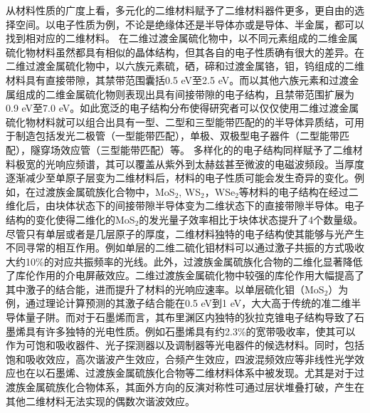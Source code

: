     从材料性质的广度上看，多元化的二维材料赋予了二维材料器件更多，更自由的选择空间。以电子性质为例，不论是绝缘体还是半导体亦或是导体、半金属，都可以找到相对应的二维材料。
    在二维过渡金属硫化物中，以不同元素组成的二维金属硫化物材料虽然都具有相似的晶体结构，但其各自的电子性质确有很大的差异。在二维过渡金属硫化物中，以六族元素硫，硒，碲和过渡金属铬，钼，钨组成的二维材料具有直接带隙，其禁带范围囊括0.5 eV至2.5 eV。而以其他六族元素和过渡金属组成的二维金属硫化物则表现出具有间接带隙的电子结构，且禁带范围扩展为0.9 eV至7.0 eV。如此宽泛的电子结构分布使得研究者可以仅仅使用二维过渡金属硫化物材料就可以组合出具有一型、二型和三型能带匹配的的半导体异质结，可用于制造包括发光二极管（一型能带匹配），单极、双极型电子器件（二型能带匹配），隧穿场效应管（三型能带匹配）等。
    多样化的的电子结构同样赋予了二维材料极宽的光响应频谱，其可以覆盖从紫外到太赫兹甚至微波的电磁波频段。当厚度逐渐减少至单原子层变为二维材料后，材料的电子性质可能会发生奇异的变化。例如，在过渡族金属硫族化合物中，MoS$_2$, WS$_2$，WSe$_2$等材料的电子结构在经过二维化后，由块体状态下的间接带隙半导体变为二维状态下的直接带隙半导体。电子结构的变化使得二维化的MoS$_2$的发光量子效率相比于块体状态提升了4个数量级。尽管只有单层或者是几层原子的厚度，二维材料独特的电子结构使其能够与光产生不同寻常的相互作用。例如单层的二维二硫化钼材料可以通过激子共振的方式吸收大约10\%的对应共振频率的光线。此外，过渡族金属硫族化合物的二维化显著降低了库伦作用的介电屏蔽效应。二维过渡族金属硫化物中较强的库伦作用大幅提高了其中激子的结合能，进而提升了材料的光响应速率。以单层硫化钼（MoS$_2$）为例，通过理论计算预测的其激子结合能在0.5 eV到1 eV，大大高于传统的准二维半导体量子阱。而对于石墨烯而言，其布里渊区内独特的狄拉克锥电子结构导致了石墨烯具有许多独特的光电性质。例如石墨烯具有约2.3\%的宽带吸收率，使其可以作为可饱和吸收器件、光子探测器以及调制器等光电器件的候选材料。同时，包括饱和吸收效应，高次谐波产生效应，合频产生效应，四波混频效应等非线性光学效应也在以石墨烯、过渡族金属硫族化合物等二维材料体系中被发现。尤其是对于过渡族金属硫族化合物体系，其面外方向的反演对称性可通过层状堆叠打破，产生在其他二维材料无法实现的偶数次谐波效应。%

